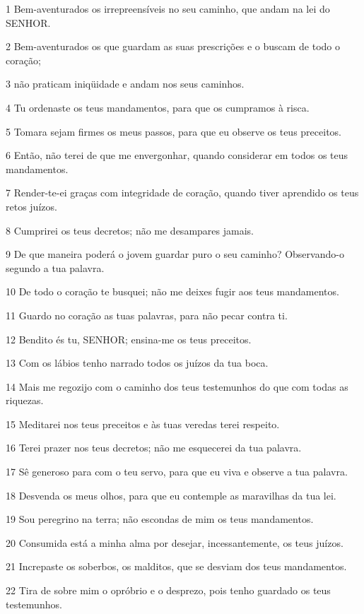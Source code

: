 \par 1 Bem-aventurados os irrepreensíveis no seu caminho, que andam na lei do SENHOR.
\par 2 Bem-aventurados os que guardam as suas prescrições e o buscam de todo o coração;
\par 3 não praticam iniqüidade e andam nos seus caminhos.
\par 4 Tu ordenaste os teus mandamentos, para que os cumpramos à risca.
\par 5 Tomara sejam firmes os meus passos, para que eu observe os teus preceitos.
\par 6 Então, não terei de que me envergonhar, quando considerar em todos os teus mandamentos.
\par 7 Render-te-ei graças com integridade de coração, quando tiver aprendido os teus retos juízos.
\par 8 Cumprirei os teus decretos; não me desampares jamais.
\par 9 De que maneira poderá o jovem guardar puro o seu caminho? Observando-o segundo a tua palavra.
\par 10 De todo o coração te busquei; não me deixes fugir aos teus mandamentos.
\par 11 Guardo no coração as tuas palavras, para não pecar contra ti.
\par 12 Bendito és tu, SENHOR; ensina-me os teus preceitos.
\par 13 Com os lábios tenho narrado todos os juízos da tua boca.
\par 14 Mais me regozijo com o caminho dos teus testemunhos do que com todas as riquezas.
\par 15 Meditarei nos teus preceitos e às tuas veredas terei respeito.
\par 16 Terei prazer nos teus decretos; não me esquecerei da tua palavra.
\par 17 Sê generoso para com o teu servo, para que eu viva e observe a tua palavra.
\par 18 Desvenda os meus olhos, para que eu contemple as maravilhas da tua lei.
\par 19 Sou peregrino na terra; não escondas de mim os teus mandamentos.
\par 20 Consumida está a minha alma por desejar, incessantemente, os teus juízos.
\par 21 Increpaste os soberbos, os malditos, que se desviam dos teus mandamentos.
\par 22 Tira de sobre mim o opróbrio e o desprezo, pois tenho guardado os teus testemunhos.
